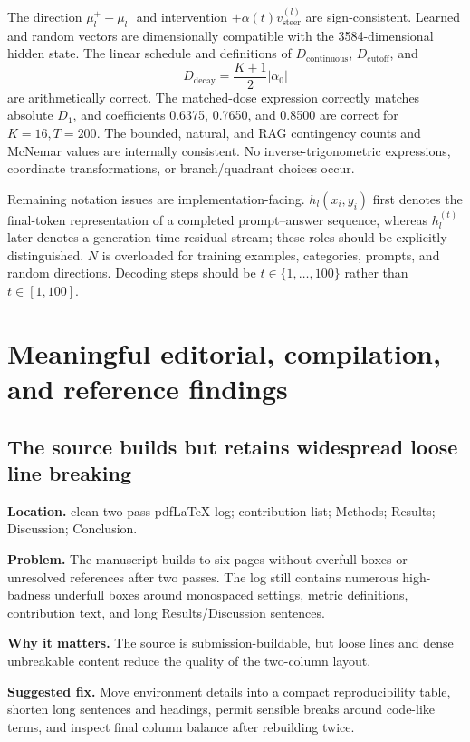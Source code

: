 \documentclass[11pt]{article}
\newcommand{\findinglabel}[1]{\textbf{#1}}
\begin{document}
The direction $\mu_l^+-\mu_l^-$ and intervention $+\alpha(t)v_{\text{steer}}^{(l)}$ are sign-consistent.  Learned and random vectors are dimensionally compatible with the 3584-dimensional hidden state.  The linear schedule and definitions of $D_{\text{continuous}}$, $D_{\text{cutoff}}$, and
\[
D_{\text{decay}}=\frac{K+1}{2}|\alpha_0|
\]
are arithmetically correct.  The matched-dose expression correctly matches absolute $D_1$, and coefficients 0.6375, 0.7650, and 0.8500 are correct for $K=16,T=200$.  The bounded, natural, and RAG contingency counts and McNemar values are internally consistent.  No inverse-trigonometric expressions, coordinate transformations, or branch/quadrant choices occur.

Remaining notation issues are implementation-facing.  $h_l(x_i,y_i)$ first denotes the final-token representation of a completed prompt--answer sequence, whereas $h_l^{(t)}$ later denotes a generation-time residual stream; these roles should be explicitly distinguished.  $N$ is overloaded for training examples, categories, prompts, and random directions.  Decoding steps should be $t\in\{1,\ldots,100\}$ rather than $t\in[1,100]$.

\section*{Meaningful editorial, compilation, and reference findings}

\subsection*{The source builds but retains widespread loose line breaking}

\findinglabel{Location.} clean two-pass pdfLaTeX log; contribution list; Methods; Results; Discussion; Conclusion.

\findinglabel{Problem.} The manuscript builds to six pages without overfull boxes or unresolved references after two passes.  The log still contains numerous high-badness underfull boxes around monospaced settings, metric definitions, contribution text, and long Results/Discussion sentences.

\findinglabel{Why it matters.} The source is submission-buildable, but loose lines and dense unbreakable content reduce the quality of the two-column layout.

\findinglabel{Suggested fix.} Move environment details into a compact reproducibility table, shorten long sentences and headings, permit sensible breaks around code-like terms, and inspect final column balance after rebuilding twice.
\end{document}
